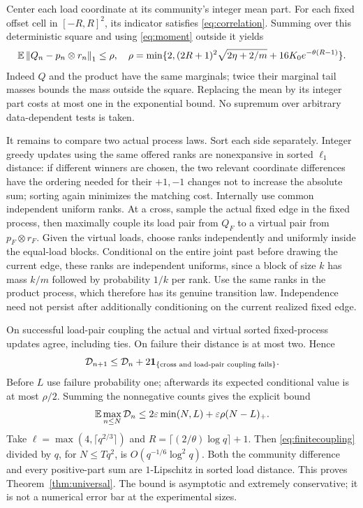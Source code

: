 Center each load coordinate at its community's integer mean part. For each fixed offset cell in $[-R,R]^2$, its indicator satisfies \eqref{eq:correlation}. Summing over this deterministic square and using \eqref{eq:moment} outside it yields
\begin{equation}\label{eq:rho}
 \mathbb E\left\lVert Q_n-p_n\otimes r_n\right\rVert_1\le\rho,
 \quad \rho=\min\{2,(2R+1)^2\sqrt{2\eta+2/m}
                      +16K_0e^{-\theta(R-1)}\}.
\end{equation}
Indeed $Q$ and the product have the same marginals; twice their marginal tail masses bounds the mass outside the square. Replacing the mean by its integer part costs at most one in the exponential bound. No supremum over arbitrary data-dependent tests is taken.

It remains to compare two actual process laws. Sort each side separately. Integer greedy updates using the same offered ranks are nonexpansive in sorted $\ell_1$ distance: if different winners are chosen, the two relevant coordinate differences have the ordering needed for their $+1,-1$ changes not to increase the absolute sum; sorting again minimizes the matching cost. Internally use common independent uniform ranks. At a cross, sample the actual fixed edge in the fixed process, then maximally couple its load pair from $Q_F$ to a virtual pair from $p_F\otimes r_F$. Given the virtual loads, choose ranks independently and uniformly inside the equal-load blocks. Conditional on the entire joint past before drawing the current edge, these ranks are independent uniforms, since a block of size $k$ has mass $k/m$ followed by probability $1/k$ per rank. Use the same ranks in the product process, which therefore has its genuine transition law. Independence need not persist after additionally conditioning on the current realized fixed edge.

On successful load-pair coupling the actual and virtual sorted fixed-process updates agree, including ties. On failure their distance is at most two. Hence
\[
 \mathcal D_{n+1}\le\mathcal D_n+
 2\mathbf 1_{\{\text{cross and load-pair coupling fails}\}}.
\]
Before $L$ use failure probability one; afterwards its expected conditional value is at most $\rho/2$. Summing the nonnegative counts gives the explicit bound
\begin{equation}\label{eq:finitecoupling}
 \mathbb E\max_{n\le N}\mathcal D_n
 \le2\varepsilon\min(N,L)+\varepsilon\rho(N-L)_+.
\end{equation}
Take $\ell=\max(4,\lceil q^{2/3}\rceil)$ and $R=\lceil(2/\theta)\log q\rceil+1$. Then \eqref{eq:finitecoupling} divided by $q$, for $N\le Tq^2$, is $O(q^{-1/6}\log^2q)$. Both the community difference and every positive-part sum are $1$-Lipschitz in sorted load distance. This proves Theorem~\ref{thm:universal}. The bound is asymptotic and extremely conservative; it is not a numerical error bar at the experimental sizes.
